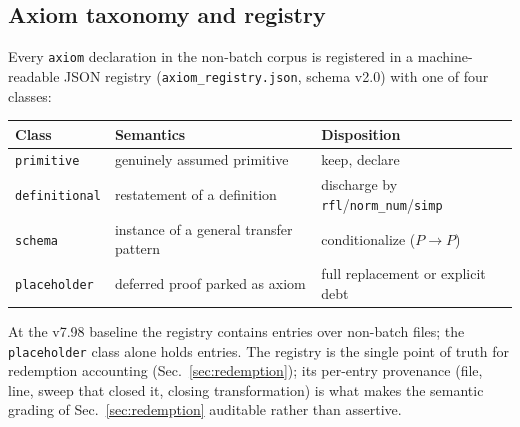 
\subsection{Axiom taxonomy and registry}
\label{sec:taxonomy}
Every \texttt{axiom} declaration in the non-batch corpus is registered
in a machine-readable JSON registry (\texttt{axiom\_registry.json},
schema v2.0) with one of four classes:

\begin{center}
\begin{tabular}{@{}lll@{}}
\toprule
\textbf{Class} & \textbf{Semantics} & \textbf{Disposition} \\
\midrule
\texttt{primitive} & genuinely assumed primitive & keep, declare \\
\texttt{definitional} & restatement of a definition & discharge by
\texttt{rfl}/\texttt{norm\_num}/\texttt{simp} \\
\texttt{schema} & instance of a general transfer pattern &
conditionalize ($P\!\to\!P$) \\
\texttt{placeholder} & deferred proof parked as axiom & full
replacement or explicit debt \\
\bottomrule
\end{tabular}
\end{center}

At the v7.98 baseline the registry contains  entries over
 non-batch files; the \texttt{placeholder} class alone holds
 entries.
The registry is the single point of truth for redemption accounting
(Sec.~\ref{sec:redemption}); its per-entry provenance (file, line,
sweep that closed it, closing transformation) is what makes the
semantic grading of Sec.~\ref{sec:redemption} auditable rather than
assertive.

